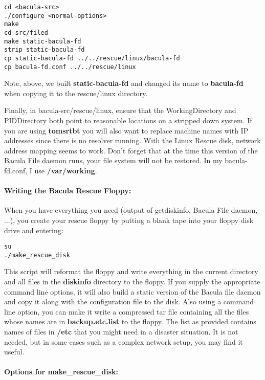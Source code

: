 \footnotesize
\begin{verbatim}
cd <bacula-src>
./configure <normal-options>
make
cd src/filed
make static-bacula-fd
strip static-bacula-fd
cp static-bacula-fd ../../rescue/linux/bacula-fd
cp bacula-fd.conf ../../rescue/linux
\end{verbatim}
\normalsize

Note, above, we built {\bf static-bacula-fd} and changed its name to {\bf
bacula-fd} when copying it to the rescue/linux directory. 

Finally, in \lt{}bacula-src\gt{}/rescue/linux, ensure that the
WorkingDirectory and PIDDirectory both point to reasonable locations on a
stripped down system. If you are using {\bf tomsrtbt} you will also want to
replace machine names with IP addresses since there is no resolver running.
With the Linux Rescue disk, network address mapping seems to work. Don't
forget that at the time this version of the Bacula File daemon runs, your file
system will not be restored. In my bacula-fd.conf, I use {\bf /var/working}. 

\paragraph*{Writing the Bacula Rescue Floppy:}

When you have everything you need (output of getdiskinfo, Bacula File daemon,
...), you create your rescue floppy by putting a blank tape into your floppy
disk drive and entering: 

\footnotesize
\begin{verbatim}
su
./make_rescue_disk
\end{verbatim}
\normalsize

This script will reformat the floppy and write everything in the current
directory and all files in the {\bf diskinfo} directory to the floppy. If you
supply the appropriate command line options, it will also build a static
version of the Bacula file daemon and copy it along with the configuration
file to the disk. Also using a command line option, you can make it write a
compressed tar file containing all the files whose names are in {\bf
backup.etc.list} to the floppy. The list as provided contains names of files
in {\bf /etc} that you might need in a disaster situation. It is not needed,
but in some cases such as a complex network setup, you may find it useful. 

\paragraph*{Options for make\_rescue\_disk:}

